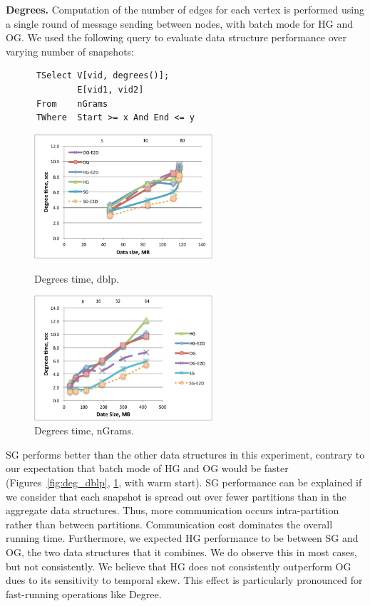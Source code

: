 {\bf Degrees.} Computation of the number of edges for each vertex is
performed using a single round of message sending between nodes, with
batch mode for HG and OG.  We used the following query to evaluate
data structure performance over varying number of snapshots:

\begin{small}
\begin{verbatim}
      TSelect V[vid, degrees()];
              E[vid1, vid2]
      From    nGrams
      TWhere  Start >= x And End <= y
\end{verbatim}
\end{small}

\begin{figure}[t]
\centering
\begin{minipage}{3in}
  \centering
  \includegraphics[width=2.6in]{figs/degrees_dblp.pdf}
  \vspace{-0.1in}
  \caption{Degrees time, dblp.}
  \label{fig:deg_dblp}
  \vspace{-0.1in}
\end{minipage}
\begin{minipage}{3in}
  \centering
\includegraphics[width=2.6in]{figs/degrees_ngrams.pdf}
  \vspace{-0.1in}
\caption{Degrees time, nGrams.}
\label{fig:deg_ngrams}
  \vspace{-0.1in}
\end{minipage}
\end{figure}

SG performs better than the other data structures in this experiment,
contrary to our expectation that batch mode of HG and OG would be
faster (Figures~\ref{fig:deg_dblp}, \ref{fig:deg_ngrams}, with warm
start).  SG performance can be explained if we consider that each
snapshot is spread out over fewer partitions than in the aggregate
data structures.  Thus, more communication occurs intra-partition
rather than between partitions.  Communication cost dominates the
overall running time.  Furthermore, we expected HG performance to be
between SG and OG, the two data structures that it combines.  We do
observe this in most cases, but not consistently.  We believe that HG
does not consistently outperform OG dues to its sensitivity to
temporal skew.  This effect is particularly pronounced for
fast-running operations like Degree.

